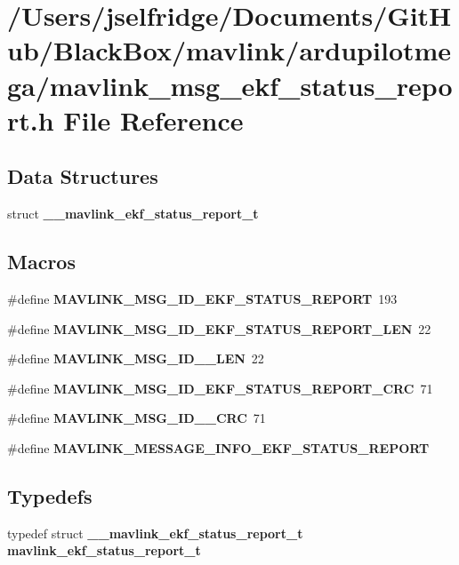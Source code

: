 \section{/\+Users/jselfridge/\+Documents/\+Git\+Hub/\+Black\+Box/mavlink/ardupilotmega/mavlink\+\_\+msg\+\_\+ekf\+\_\+status\+\_\+report.h File Reference}
\label{mavlink__msg__ekf__status__report_8h}
\subsection*{Data Structures}
\begin{DoxyCompactItemize}
\item 
struct \textbf{ \+\_\+\+\_\+mavlink\+\_\+ekf\+\_\+status\+\_\+report\+\_\+t}
\end{DoxyCompactItemize}
\subsection*{Macros}
\begin{DoxyCompactItemize}
\item 
\#define \textbf{ M\+A\+V\+L\+I\+N\+K\+\_\+\+M\+S\+G\+\_\+\+I\+D\+\_\+\+E\+K\+F\+\_\+\+S\+T\+A\+T\+U\+S\+\_\+\+R\+E\+P\+O\+RT}~193
\item 
\#define \textbf{ M\+A\+V\+L\+I\+N\+K\+\_\+\+M\+S\+G\+\_\+\+I\+D\+\_\+\+E\+K\+F\+\_\+\+S\+T\+A\+T\+U\+S\+\_\+\+R\+E\+P\+O\+R\+T\+\_\+\+L\+EN}~22
\item 
\#define \textbf{ M\+A\+V\+L\+I\+N\+K\+\_\+\+M\+S\+G\+\_\+\+I\+D\+\_\+\_\+\+L\+EN}~22
\item 
\#define \textbf{ M\+A\+V\+L\+I\+N\+K\+\_\+\+M\+S\+G\+\_\+\+I\+D\+\_\+\+E\+K\+F\+\_\+\+S\+T\+A\+T\+U\+S\+\_\+\+R\+E\+P\+O\+R\+T\+\_\+\+C\+RC}~71
\item 
\#define \textbf{ M\+A\+V\+L\+I\+N\+K\+\_\+\+M\+S\+G\+\_\+\+I\+D\+\_\+\_\+\+C\+RC}~71
\item 
\#define \textbf{ M\+A\+V\+L\+I\+N\+K\+\_\+\+M\+E\+S\+S\+A\+G\+E\+\_\+\+I\+N\+F\+O\+\_\+\+E\+K\+F\+\_\+\+S\+T\+A\+T\+U\+S\+\_\+\+R\+E\+P\+O\+RT}
\end{DoxyCompactItemize}
\subsection*{Typedefs}
\begin{DoxyCompactItemize}
\item 
typedef struct \textbf{ \+\_\+\+\_\+mavlink\+\_\+ekf\+\_\+status\+\_\+report\+\_\+t} \textbf{ mavlink\+\_\+ekf\+\_\+status\+\_\+report\+\_\+t}
\end{DoxyCompactItemize}


